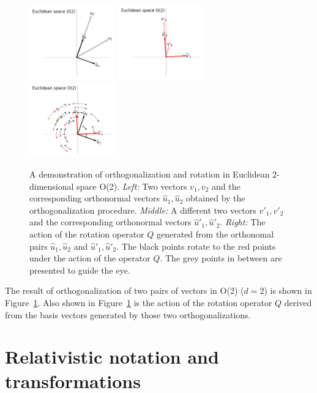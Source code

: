 \documentclass{article}
\newcommand{\figref}[1]{Figure~\ref{#1}}
\begin{document}
\begin{figure}[t]
\includegraphics[width=0.33\textwidth]{E_v.png}%
\includegraphics[width=0.33\textwidth]{E_vp.png}%
\includegraphics[width=0.33\textwidth]{E_Q.png}
\caption{A demonstration of orthogonalization and rotation in Euclidean 2-dimensional space O(2).
\textsl{Left:} Two vectors $v_1, v_2$ and the corresponding orthonormal vectors $\hat{u}_1, \hat{u}_2$ obtained by the orthogonalization procedure.
\textsl{Middle:} A different two vectors $v'_1, v'_2$ and the corresponding orthonormal vectors $\hat{u}'_1, \hat{u}'_2$.
\textsl{Right:} The action of the rotation operator $Q$ generated from the orthonomal pairs $\hat{u}_1, \hat{u}_2$ and $\hat{u}'_1, \hat{u}'_2$.
The black points rotate to the red points under the action of the operator $Q$.
The grey points in between are presented to guide the eye.\label{fig:Euclid}}
\end{figure}
The result of orthogonalization of two pairs of vectors in O(2) ($d=2$) is shown in \figref{fig:Euclid}.
Also shown in \figref{fig:Euclid} is the action of the rotation operator $Q$ derived from the basis vectors generated by those two orthogonalizations.

\section{Relativistic notation and transformations}\label{sec:notation}
\end{document}
